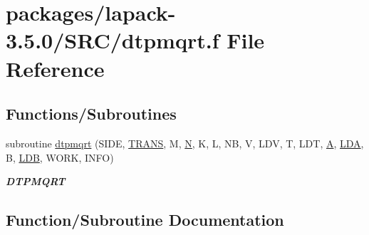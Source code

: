 \hypertarget{dtpmqrt_8f}{}\section{packages/lapack-\/3.5.0/\+S\+R\+C/dtpmqrt.f File Reference}
\label{dtpmqrt_8f}
\subsection*{Functions/\+Subroutines}
\begin{DoxyCompactItemize}
\item 
subroutine \hyperlink{dtpmqrt_8f_ac998dca531aab64da39faff6b9dd9675}{dtpmqrt} (S\+I\+D\+E, \hyperlink{superlu__enum__consts_8h_a0c4e17b2d5cea33f9991ccc6a6678d62a1f61e3015bfe0f0c2c3fda4c5a0cdf58}{T\+R\+A\+N\+S}, M, \hyperlink{polmisc_8c_a0240ac851181b84ac374872dc5434ee4}{N}, K, L, N\+B, V, L\+D\+V, T, L\+D\+T, \hyperlink{classA}{A}, \hyperlink{example__user_8c_ae946da542ce0db94dced19b2ecefd1aa}{L\+D\+A}, B, \hyperlink{example__user_8c_a50e90a7104df172b5a89a06c47fcca04}{L\+D\+B}, W\+O\+R\+K, I\+N\+F\+O)
\begin{DoxyCompactList}\small\item\em {\bfseries D\+T\+P\+M\+Q\+R\+T} \end{DoxyCompactList}\end{DoxyCompactItemize}


\subsection{Function/\+Subroutine Documentation}
\hypertarget{dtpmqrt_8f_ac998dca531aab64da39faff6b9dd9675}{}
